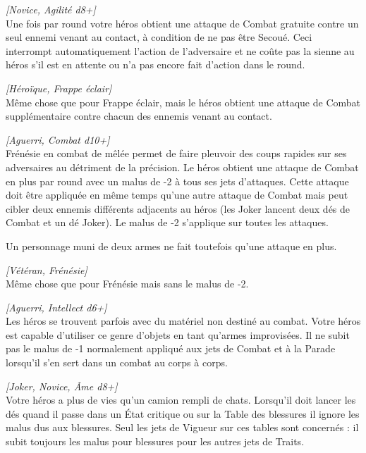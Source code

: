 \begin{description}[align=left]
    \item [Frappe éclair]
    	\emph{[Novice, Agilité d8+]}\\
        Une fois par round votre héros obtient une attaque de Combat gratuite contre un seul ennemi venant au contact, à condition de ne pas être Secoué. Ceci interrompt automatiquement l’action de l’adversaire et ne coûte pas la sienne au héros s’il est en attente ou n’a pas encore fait d’action dans le round.

    \item [Frappe foudroyante]
    	\emph{[Héroïque, Frappe éclair]}\\
        Même chose que pour Frappe éclair, mais le héros obtient une attaque de Combat supplémentaire contre chacun des ennemis venant au contact.

    \item [Frénésie]
    	\emph{[Aguerri, Combat d10+]}\\
        Frénésie en combat de mêlée permet de faire pleuvoir des coups rapides sur ses adversaires au détriment de la précision. Le héros obtient une attaque de Combat en plus par round avec un malus de -2 à tous ses jets d’attaques. Cette attaque doit être appliquée en même temps qu’une autre attaque de Combat mais peut cibler deux ennemis différents adjacents au héros (les Joker lancent deux dés de Combat et un dé Joker). Le malus de -2 s’applique sur toutes les attaques. 

        Un personnage muni de deux armes ne fait toutefois qu’une attaque en plus.

    \item [Frénésie suprême]
    	\emph{[Vétéran, Frénésie]}\\
        Même chose que pour Frénésie mais sans le malus de -2.

    \item [Improvisation martiale]
    	\emph{[Aguerri, Intellect d6+]}\\
        Les héros se trouvent parfois avec du matériel non destiné au combat. Votre héros est capable d’utiliser ce genre d’objets en tant qu’armes improvisées. Il ne subit pas le malus de -1 normalement appliqué aux jets de Combat et à la Parade lorsqu’il s’en sert dans un combat au corps à corps.

    \item [Increvable]
    	\emph{[Joker, Novice, Âme d8+]}\\
        Votre héros a plus de vies qu’un camion rempli de chats. Lorsqu’il doit lancer les dés quand il passe dans un \'Etat critique ou sur la Table des blessures il ignore les malus dus aux blessures. Seul les jets de Vigueur sur ces tables sont concernés : il subit toujours les malus pour blessures pour les autres jets de Traits.


\end{description}
